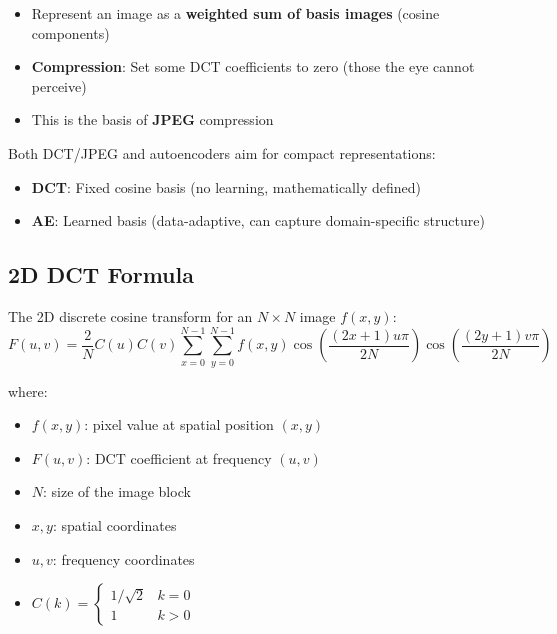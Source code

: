 \documentclass[12pt,a4paper]{article}
\begin{document}
\begin{itemize}
  \item Represent an image as a \textbf{weighted sum of basis images} (cosine components)
  \item \textbf{Compression}: Set some DCT coefficients to zero (those the eye cannot perceive)
  \item This is the basis of \textbf{JPEG} compression
\end{itemize}

\begin{notebox}
Both DCT/JPEG and autoencoders aim for compact representations:
\begin{itemize}
  \item \textbf{DCT}: Fixed cosine basis (no learning, mathematically defined)
  \item \textbf{AE}: Learned basis (data-adaptive, can capture domain-specific structure)
\end{itemize}
\end{notebox}

\subsection{2D DCT Formula}

The 2D discrete cosine transform for an $N\times N$ image $f(x,y)$:
\[
  F(u,v) = \frac{2}{N}C(u)C(v)
    \sum_{x=0}^{N-1}\sum_{y=0}^{N-1}
      f(x,y)
      \cos\!\left(\frac{(2x+1)u\pi}{2N}\right)
      \cos\!\left(\frac{(2y+1)v\pi}{2N}\right)
\]

where:
\begin{itemize}
  \item $f(x,y)$: pixel value at spatial position $(x,y)$
  \item $F(u,v)$: DCT coefficient at frequency $(u,v)$
  \item $N$: size of the image block
  \item $x, y$: spatial coordinates
  \item $u, v$: frequency coordinates
  \item $C(k) = \begin{cases} 1/\sqrt{2} & k = 0\\ 1 & k > 0 \end{cases}$
\end{itemize}

\end{document}
